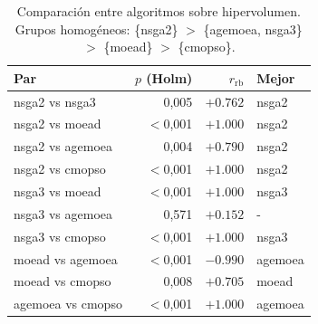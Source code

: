 \begin{table}[!htbp]
\centering
\caption{Comparación entre algoritmos sobre hipervolumen. Grupos homogéneos: \{\acrshort{nsga2}\} $>$ \{\acrshort{agemoea}, \acrshort{nsga3}\} $>$ \{\acrshort{moead}\} $>$ \{\acrshort{cmopso}\}.}
\label{tab:comparacion_grupos}
\begin{tabular}{lrrl}
\toprule
Par & $p$ (Holm) & $r_{\text{rb}}$ & Mejor \\
\midrule
\acrshort{nsga2} vs \acrshort{nsga3} & 0,005 & $+0.762$ & \acrshort{nsga2} \\
\acrshort{nsga2} vs \acrshort{moead} & $<$0,001 & $+1.000$ & \acrshort{nsga2} \\
\acrshort{nsga2} vs \acrshort{agemoea} & 0,004 & $+0.790$ & \acrshort{nsga2} \\
\acrshort{nsga2} vs \acrshort{cmopso} & $<$0,001 & $+1.000$ & \acrshort{nsga2} \\
\acrshort{nsga3} vs \acrshort{moead} & $<$0,001 & $+1.000$ & \acrshort{nsga3} \\
\acrshort{nsga3} vs \acrshort{agemoea} & 0,571 & $+0.152$ & - \\
\acrshort{nsga3} vs \acrshort{cmopso} & $<$0,001 & $+1.000$ & \acrshort{nsga3} \\
\acrshort{moead} vs \acrshort{agemoea} & $<$0,001 & $-0.990$ & \acrshort{agemoea} \\
\acrshort{moead} vs \acrshort{cmopso} & 0,008 & $+0.705$ & \acrshort{moead} \\
\acrshort{agemoea} vs \acrshort{cmopso} & $<$0,001 & $+1.000$ & \acrshort{agemoea} \\
\bottomrule
\end{tabular}
\end{table}
